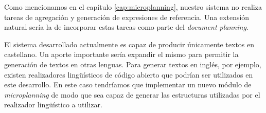 Como mencionamos en el capítulo \ref{cap:microplanning}, nuestro sistema no realiza tareas de agregación y generación de expresiones de referencia. Una extensión natural sería la de incorporar estas tareas como parte del \textit{document planning}.

El sistema desarrollado actualmente es capaz de producir únicamente textos en castellano. Un aporte importante sería expandir el mismo para permitir la generación de textos en otras lenguas. Para generar textos en inglés, por ejemplo, existen realizadores lingüísticos de código abierto que podrían ser utilizados en este desarrollo. En este caso tendríamos que implementar un nuevo módulo de \textit{microplanning} de modo que sea capaz de generar las estructuras utilizadas por el realizador lingüístico a utilizar.